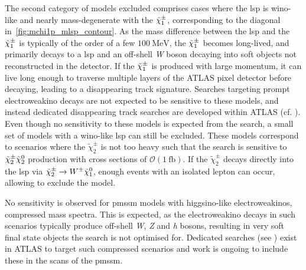 The second category of models excluded comprises cases where the \gls{lsp} is wino-like and nearly mass-degenerate with the $\tilde{\chi}_1^\pm$, corresponding to the diagonal in~\cref{fig:mchi1p_mlsp_contour}. As the mass difference between the \gls{lsp} and the $\tilde{\chi}_1^\pm$ is typically of the order of a few $\SI{100}{\MeV}$, the $\tilde{\chi}_1^\pm$ becomes long-lived, and primarily decays to a \gls{lsp} and an off-shell \textit{W} boson decaying into soft objects not reconstructed in the detector.
If the $\tilde{\chi}_1^\pm$ is produced with large momentum, it can live long enough to traverse multiple layers of the ATLAS pixel detector before decaying, leading to a disappearing track signature. Searches targeting prompt electroweakino decays are not expected to be sensitive to these models, and instead dedicated disappearing track searches are developed within ATLAS (cf. \eg {}\cite{ATLAS-CONF-2021-015}). 
Even though no sensitivity to these models is expected from the \onelepton search, a small set of models with a wino-like \gls{lsp} can still be excluded. These models correspond to scenarios where the $\tilde{\chi}^\pm_2$ is not too heavy such that the \onelepton search is sensitive to $\tilde{\chi}^\pm_2\tilde{\chi}_2^0$ production with cross sections of $\mathcal{O}(\SI{1}{\femto\barn})$.
If the $\tilde{\chi}^\pm_2$ decays directly into the \gls{lsp} via $\tilde{\chi}^\pm_2 \rightarrow W^\pm \tilde{\chi}_1^0$, enough events with an isolated lepton can occur, allowing to exclude the model.

No sensitivity is observed for \gls{pmssm} models with higgsino-like electroweakinos, \ie compressed mass spectra. This is expected, as the electroweakino decays in such scenarios typically produce off-shell \textit{W}, \textit{Z} and \textit{h} bosons, resulting in very soft final state objects the \onelepton search is not optimised for. Dedicated searches (see \eg {}\cite{SUSY-2018-16}) exist in ATLAS to target such compressed scenarios and work is ongoing to include these in the scans of the \gls{pmssm}.

